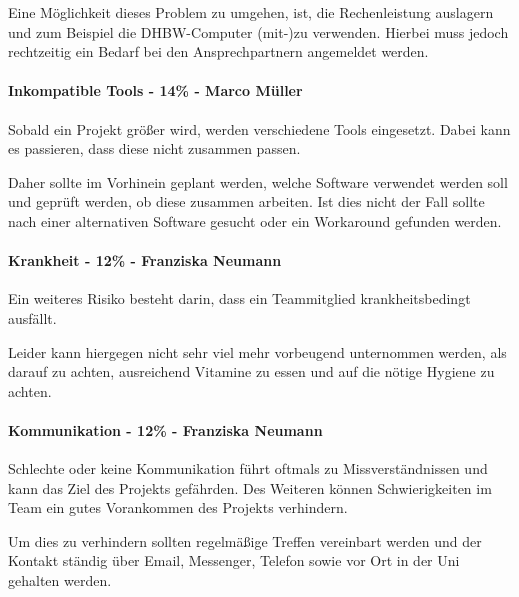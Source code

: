 Eine Möglichkeit dieses Problem zu umgehen, ist, die \glqq Rechenleistung\grqq{} auslagern und zum Beispiel die DHBW-Computer (mit-)zu verwenden. Hierbei muss jedoch rechtzeitig ein Bedarf bei den Ansprechpartnern angemeldet werden.

\paragraph{Inkompatible Tools - 14\% - Marco Müller}
Sobald ein Projekt größer wird, werden verschiedene Tools eingesetzt. Dabei kann es passieren, dass diese nicht zusammen passen. 

Daher sollte im Vorhinein geplant werden, welche Software verwendet werden soll und geprüft werden, ob diese zusammen arbeiten. Ist dies nicht der Fall sollte nach einer alternativen Software gesucht oder ein Workaround gefunden werden.

\paragraph{Krankheit - 12\% - Franziska Neumann}
Ein weiteres Risiko besteht darin, dass ein Teammitglied krankheitsbedingt ausfällt. 

Leider kann hiergegen nicht sehr viel mehr vorbeugend unternommen werden, als darauf zu achten, ausreichend Vitamine zu essen und auf die nötige Hygiene zu achten.

\paragraph{Kommunikation - 12\% - Franziska Neumann}
Schlechte oder keine Kommunikation führt oftmals zu Missverständnissen und kann das Ziel des Projekts gefährden. Des Weiteren können Schwierigkeiten im Team ein gutes Vorankommen des Projekts verhindern.

Um dies zu verhindern sollten regelmäßige Treffen vereinbart werden und der Kontakt ständig über Email, Messenger, Telefon sowie vor Ort in der Uni gehalten werden.
